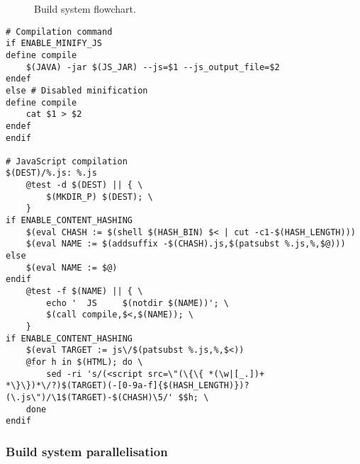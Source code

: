 \begin{figure}[H]
\caption[Build system flowchart]{Build system flowchart.}
\label{fig:build-system-flowchart}
\end{figure}

\newpage

\lstset{language=make}
\begin{lstlisting}[label=lst:build-javascript,caption={
      [Autotools Makefile pattern for JavaScript compilation]
      Autotools Makefile pattern for JavaScript compilation, taken
      from \texttt{www/js/Makefile.am}. The conditional variables
      \texttt{ENABLE\_MINI\_JS} and
      \texttt{ENABLE\_CONTENT\_HASHING} are used to control the
      behaviour of the compilation, and are set by passing argument
      flags to the configuration script.}]
# Compilation command
if ENABLE_MINIFY_JS
define compile
    $(JAVA) -jar $(JS_JAR) --js=$1 --js_output_file=$2
endef
else # Disabled minification
define compile
    cat $1 > $2
endef
endif

# JavaScript compilation
$(DEST)/%.js: %.js
    @test -d $(DEST) || { \
        $(MKDIR_P) $(DEST); \
    }
if ENABLE_CONTENT_HASHING
    $(eval CHASH := $(shell $(HASH_BIN) $< | cut -c1-$(HASH_LENGTH)))
    $(eval NAME := $(addsuffix -$(CHASH).js,$(patsubst %.js,%,$@)))
else
    $(eval NAME := $@)
endif
    @test -f $(NAME) || { \
        echo '  JS     $(notdir $(NAME))'; \
        $(call compile,$<,$(NAME)); \
    }
if ENABLE_CONTENT_HASHING
    $(eval TARGET := js\/$(patsubst %.js,%,$<))
    @for h in $(HTML); do \
        sed -ri 's/(<script src=\"(\{\{ *(\w|[_.])+ *\}\})*\/?)$(TARGET)(-[0-9a-f]{$(HASH_LENGTH)})?(\.js\")/\1$(TARGET)-$(CHASH)\5/' $$h; \
    done
endif
\end{lstlisting}

\subsubsection*{Build system parallelisation}


